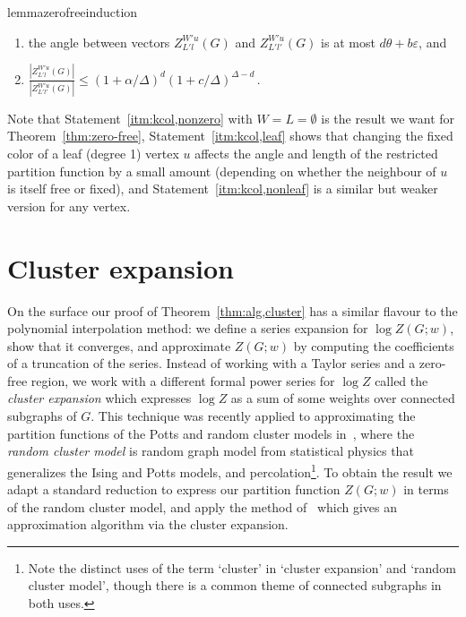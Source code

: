 \documentclass[10pt,a4paper]{article}
\theoremstyle{definition}
\newcommand*{\eps}{\varepsilon}
\newenvironment{itemeq}{\hspace*{\fill}$\displaystyle}{$\hspace*{\fill}}
\begin{document}
\begin{restatable}{lemma}{zerofreeinduction}
\begin{enumerate}
 \begin{enumerate}
 \item\label{itm:kcol,nonleaf,angle} 
 the angle between vectors $Z_{L'l}^{W'u}(G)$ and $Z_{L'l'}^{W'u}(G)$ is at most $d \theta + b\eps$, and 
 \item\label{itm:kcol,nonleaf,length}
       \begin{itemeq}
          \frac{|Z_{L'l}^{W'u}(G)|}{|Z_{L'l'}^{W'u}(G)|}   \leq(1+\alpha/\Delta)^d(1+c/\Delta)^{\Delta-d}\,.
       \end{itemeq}
 \end{enumerate} 
\end{enumerate}
\end{restatable}
%
Note that Statement~\ref{itm:kcol,nonzero} with $W=L=\emptyset$ is the result we want for Theorem~\ref{thm:zero-free}, Statement~\ref{itm:kcol,leaf} shows that changing the fixed color of a leaf (degree 1) vertex $u$ affects the angle and length of the restricted partition function by a small amount (depending on whether the neighbour of $u$ is itself free or fixed), and Statement~\ref{itm:kcol,nonleaf} is a similar but weaker version for any vertex. 
%
%

\section{Cluster expansion}\label{sec:cluster}
%
On the surface our proof of Theorem~\ref{thm:alg,cluster} has a similar flavour to the polynomial interpolation method: we define a series expansion for $\log Z(G;w)$, show that it converges, and approximate $Z(G;w)$ by computing the coefficients of a truncation of the series. 
Instead of working with a Taylor series and a zero-free region, we work with a different formal power series for $\log Z$ called the \emph{cluster expansion} which expresses $\log Z$ as a sum of some weights over connected subgraphs of $G$. 
This technique was recently applied to approximating the partition functions of the Potts and random cluster models in~\cite{BCHPT19}, where the \emph{random cluster model} is random graph model from statistical physics that generalizes the Ising and Potts models, and percolation\footnote{Note the distinct uses of the term `cluster' in `cluster expansion' and `random cluster model', though there is a common theme of connected subgraphs in both uses.}.
To obtain the result we adapt a standard reduction to express our partition function $Z(G;w)$ in terms of the random cluster model, and apply the method of~\cite{BCHPT19} which gives an approximation algorithm via the cluster expansion.
%
\end{document}
